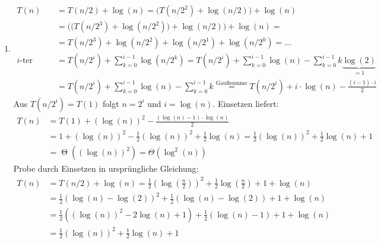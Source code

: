 \documentclass[11pt,a4paper]{article}
\begin{document}
\begin{loesung}
\begin{enumerate}
\begin{enumerate}[label=\roman*)]
        \item
        \begin{align*}
            T(n) &= T(n/2) + \log(n) = \big(T(n / 2^2) + \log(n / 2)\big) + \log(n) \\
            &= \Big(\big(T(n / 2^3) + \log(n / 2^2)\big) + \log(n / 2)\Big) + \log(n) = \\
            &= T(n / 2^3) + \log(n / 2^2) + \log(n / 2^1) + \log(n / 2^0) = \ldots \\
            \text{$i$-ter Schritt: } &= T(n / 2^i) + \sum\limits_{k = 0}^{i - 1} \log(n / 2^k)
            = T(n / 2^i) + \sum\limits_{k = 0}^{i - 1} \log(n) - \sum\limits_{k = 0}^{i - 1} k \underbrace{\log(2)}_{= 1} \\
            &= T(n / 2^i) + \sum\limits_{k = 0}^{i - 1} \log(n) - \sum\limits_{k = 0}^{i - 1}  k
            \overset{\text{Gaußsumme}}{=} T(n / 2^i) + i \cdot \log(n) - \frac{(i - 1) \cdot i}{2}
        \end{align*}
        Aus $T(n / 2^i) = T(1)$ folgt $n = 2^i$ und $i = \log(n)$. Einsetzen liefert:
        \begin{align*}
            T(n) &= T(1) + (\log(n))^2 - \frac{(\log(n) - 1) \cdot \log(n)}{2} \\
            &= 1 + (\log(n))^2 - \frac{1}{2} (\log(n))^2 + \frac{1}{2} \log(n) 
            = \frac{1}{2} (\log(n))^2  + \frac{1}{2} \log(n) + 1\\
            &= \operatorname{\Theta}\left((\log(n))^2\right) = \Theta(\log^2(n))
        \end{align*}
        Probe durch Einsetzen in ursprüngliche Gleichung:
        \begin{align*}
            T(n) &= T(n / 2) + \log(n) = \frac{1}{2} \left(\log\left(\frac{n}{2}\right)\right)^2 + \frac{1}{2} \log\left( \frac{n}{2} \right) + 1 + \log(n) \\
            &= \frac{1}{2} \left(\log(n) - \log(2)\right)^2 + \frac{1}{2} \left( \log(n) - \log(2) \right) + 1 + \log(n) \\
            &= \frac{1}{2} ((\log(n))^2 - 2\log(n) + 1) + \frac{1}{2} \left( \log(n) - 1 \right) + 1 + \log(n) \\
            &= \frac{1}{2} (\log(n))^2  + \frac{1}{2} \log(n) + 1\\
        \end{align*}


\end{enumerate}
\end{enumerate}
\end{loesung}
\end{document}
